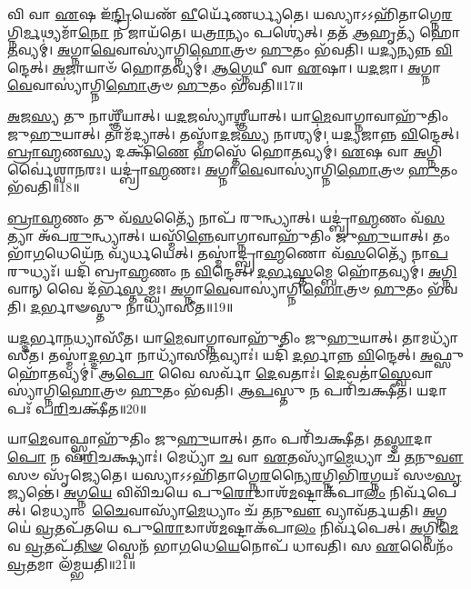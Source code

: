 𑌵𑌿 𑌵𑌾 \ul{𑌏}\-𑌷 𑌇᳴\-\ul{𑌨𑍍𑌦𑍍𑌰𑌿}\-𑌯𑍇𑌣᳴ \ul{𑌵𑍀}\-𑌰𑍍𑌯𑍇᳴𑌣𑌰𑍍𑌧𑍍𑌯𑌤𑍇।
𑌯𑌸𑍍𑌯𑌾𑌽𑌽𑌹𑌿᳴𑌤𑌾𑌗𑍍𑌨𑍇\-\-\ul{𑌰}\-𑌗𑍍𑌨𑌿\-\ul{𑌰𑍍𑌮}\-𑌥𑍍𑌯\-𑌮𑌾᳴\-\ul{𑌨𑍋} 𑌨 𑌜𑌾𑌯᳴𑌤𑍇।
𑌯\-\ul{𑌤𑍍𑌰𑌾}\-𑌨𑍍𑌯𑌂 𑌪𑌶𑍍𑌯𑍇॑𑌤𑍍।
𑌤𑌤᳴ \ul{𑌆}\-𑌹𑍃𑌤𑍍𑌯᳴ 𑌹𑍋\-\ul{𑌤}\-𑌵𑍍𑌯𑌮𑍍॑।
\-\ul{𑌅}\-𑌗𑍍𑌨𑌾\-\ul{𑌵𑍇}\-𑌵𑌾𑌸𑍍𑌯𑌾॑𑌗𑍍𑌨𑌿\-\ul{𑌹𑍋}\-𑌤𑍍𑌰𑍞 \ul{𑌹𑍁}\-𑌤𑌂 𑌭᳴𑌵𑌤𑌿।
𑌯\-\ul{𑌦𑍍𑌯}\-𑌨𑍍𑌯𑌨𑍍𑌨 \ul{𑌵𑌿}\-𑌨𑍍𑌦𑍇𑌤𑍍।
\-\ul{𑌅}\-𑌜𑌾𑌯𑌾𑍞᳴ 𑌹𑍋\-\ul{𑌤}\-𑌵𑍍𑌯𑌮𑍍॑।
\-\ul{𑌆}\-\-\ul{𑌗𑍍𑌨𑍇}\-𑌯𑍀 𑌵𑌾 \ul{𑌏}\-𑌷𑌾।
𑌯\-\ul{𑌦}\-𑌜𑌾।
\-\ul{𑌅}\-𑌗𑍍𑌨𑌾\-\ul{𑌵𑍇}\-𑌵𑌾𑌸𑍍𑌯𑌾॑𑌗𑍍𑌨𑌿\-\ul{𑌹𑍋}\-𑌤𑍍𑌰𑍞 \ul{𑌹𑍁}\-𑌤𑌂 𑌭᳴𑌵𑌤𑌿॥17॥

\-\ul{𑌅}\-𑌜\-\ul{𑌸𑍍𑌯} 𑌤𑍁 𑌨𑌾𑌶𑍍𑌞𑍀᳴𑌯𑌾𑌤𑍍।
𑌯\-\ul{𑌦}\-𑌜𑌸𑍍𑌯𑌾॑\-\ul{𑌶𑍍𑌞𑍀}\-𑌯𑌾𑌤𑍍।
𑌯𑌾\-\ul{𑌮𑍇}\-𑌵𑌾𑌗𑍍𑌨𑌾𑌵𑌾𑌹𑍁᳴𑌤𑌿𑌂 𑌜𑍁\-\ul{𑌹𑍁}\-𑌯𑌾𑌤𑍍।
𑌤𑌾𑌮᳴𑌦𑍍𑌯𑌾𑌤𑍍।
𑌤𑌸𑍍𑌮𑌾᳴\-\ul{𑌦}\-𑌜\-\ul{𑌸𑍍𑌯} 𑌨𑌾𑌶𑍍𑌯𑌮𑍍॑।
𑌯\-\ul{𑌦𑍍𑌯}\-𑌜𑌾𑌨𑍍𑌨 \ul{𑌵𑌿}\-𑌨𑍍𑌦𑍇𑌤𑍍।
\-\ul{𑌬𑍍𑌰𑌾}\-\-\ul{𑌹𑍍𑌮}\-𑌣\-\ul{𑌸𑍍𑌯} 𑌦𑌕𑍍𑌷𑌿᳴\-\ul{𑌣𑍇} 𑌹𑌸𑍍𑌤𑍇᳴ 𑌹𑍋\-\ul{𑌤}\-𑌵𑍍𑌯𑌮𑍍॑।
\-\ul{𑌏}\-𑌷 𑌵𑌾 \ul{𑌅}\-𑌗𑍍𑌨𑌿𑌰𑍍𑌵𑍈॑𑌶𑍍𑌵𑌾\-\ul{𑌨}\-𑌰𑌃।
𑌯𑌦𑍍𑌬𑍍𑌰𑌾॑\-\ul{𑌹𑍍𑌮}\-𑌣𑌃।
\-\ul{𑌅}\-𑌗𑍍𑌨𑌾\-\ul{𑌵𑍇}\-𑌵𑌾𑌸𑍍𑌯𑌾॑𑌗𑍍𑌨𑌿\-\ul{𑌹𑍋}\-𑌤𑍍𑌰𑍞 \ul{𑌹𑍁}\-𑌤𑌂 𑌭᳴𑌵𑌤𑌿॥18॥

\-\ul{𑌬𑍍𑌰𑌾}\-\-\ul{𑌹𑍍𑌮}\-𑌣𑌂 𑌤𑍁 𑌵᳴\-\ul{𑌸}\-𑌤𑍍𑌯𑍈᳴ 𑌨𑌾𑌪᳴ 𑌰𑍁𑌨𑍍𑌧𑍍𑌯𑌾𑌤𑍍।
𑌯𑌦𑍍𑌬𑍍𑌰𑌾॑\-\ul{𑌹𑍍𑌮}\-𑌣𑌂 𑌵᳴\-\ul{𑌸}\-𑌤𑍍𑌯𑌾 𑌅᳴𑌪\-\ul{𑌰𑍁}\-𑌨𑍍𑌧𑍍𑌯𑌾𑌤𑍍।
𑌯𑌸𑍍𑌮𑌿᳴\-\ul{𑌨𑍍𑌨𑍇}\-𑌵𑌾𑌗𑍍𑌨𑌾𑌵𑌾𑌹𑍁᳴𑌤𑌿𑌂 𑌜𑍁\-\ul{𑌹𑍁}\-𑌯𑌾𑌤𑍍।
𑌤𑌂 𑌭𑌾᳴\-\ul{𑌗}\-𑌧𑍇𑌯𑍇᳴\-\ul{𑌨} 𑌵𑍍𑌯᳴𑌰𑍍𑌧𑌯𑍇𑌤𑍍।
𑌤𑌸𑍍𑌮𑌾॑𑌦𑍍𑌬𑍍𑌰𑌾\-\ul{𑌹𑍍𑌮}\-𑌣𑍋 𑌵᳴\-\ul{𑌸}\-𑌤𑍍𑌯𑍈᳴ 𑌨𑌾\-\ul{𑌪}\-𑌰𑍁𑌧𑍍𑌯𑌃᳴।
𑌯𑌦𑌿᳴ 𑌬𑍍𑌰𑌾\-\ul{𑌹𑍍𑌮}\-𑌣𑌂 𑌨 \ul{𑌵𑌿}\-𑌨𑍍𑌦𑍇𑌤𑍍।
\-\ul{𑌦}\-\-\ul{𑌰𑍍𑌭}\-\-\ul{𑌸𑍍𑌤}\-𑌮𑍍𑌬𑍇 𑌹𑍋᳴\-\ul{𑌤}\-𑌵𑍍𑌯𑌮𑍍॑।
\-\ul{𑌅}\-\-\ul{𑌗𑍍𑌨𑌿}\-𑌵𑌾𑌨𑍍 𑌵𑍈 𑌦᳴𑌰𑍍𑌭\-\ul{𑌸𑍍𑌤}\-𑌮𑍍𑌬𑌃।
\-\ul{𑌅}\-𑌗𑍍𑌨𑌾\-\ul{𑌵𑍇}\-𑌵𑌾𑌸𑍍𑌯𑌾॑𑌗𑍍𑌨𑌿\-\ul{𑌹𑍋}\-𑌤𑍍𑌰𑍞 \ul{𑌹𑍁}\-𑌤𑌂 𑌭᳴𑌵𑌤𑌿।
\-\ul{𑌦}\-𑌰𑍍𑌭𑌾𑍟𑌸𑍍𑌤𑍁 𑌨𑌾𑌧𑍍𑌯𑌾᳴𑌸𑍀𑌤॥19॥

𑌯\-\ul{𑌦𑍍𑌦}\-𑌰𑍍𑌭𑌾\-\ul{𑌨}\-𑌧𑍍𑌯𑌾𑌸𑍀᳴𑌤।
𑌯𑌾\-\ul{𑌮𑍇}\-𑌵𑌾𑌗𑍍𑌨𑌾𑌵𑌾𑌹𑍁᳴𑌤𑌿𑌂 𑌜𑍁\-\ul{𑌹𑍁}\-𑌯𑌾𑌤𑍍।
𑌤𑌾𑌮𑌧𑍍𑌯𑌾᳴𑌸𑍀𑌤।
𑌤𑌸𑍍𑌮𑌾॑\-\ul{𑌦𑍍𑌦}\-𑌰𑍍𑌭𑌾 𑌨𑌾𑌧𑍍𑌯𑌾᳴𑌸𑌿\-\ul{𑌤}\-𑌵𑍍𑌯𑌾𑌃॑।
𑌯𑌦𑌿᳴ \ul{𑌦}\-𑌰𑍍𑌭𑌾𑌨𑍍𑌨 \ul{𑌵𑌿}\-𑌨𑍍𑌦𑍇𑌤𑍍।
\-\ul{𑌅}\-𑌫𑍍𑌸𑍁 𑌹𑍋᳴\-\ul{𑌤}\-𑌵𑍍𑌯𑌮𑍍॑।
𑌆\-\ul{𑌪𑍋} 𑌵𑍈 𑌸𑌰𑍍𑌵𑌾᳴ \ul{𑌦𑍇}\-𑌵𑌤𑌾𑌃॑।
\-\ul{𑌦𑍇}\-𑌵𑌤𑌾॑\-\ul{𑌸𑍍𑌵𑍇}\-𑌵𑌾𑌸𑍍𑌯𑌾॑𑌗𑍍𑌨𑌿\-\ul{𑌹𑍋}\-𑌤𑍍𑌰𑍞 \ul{𑌹𑍁}\-𑌤𑌂 𑌭᳴𑌵𑌤𑌿।
𑌆\-\ul{𑌪}\-𑌸𑍍𑌤𑍁 𑌨 𑌪𑌰𑌿᳴𑌚𑌕𑍍𑌷𑍀𑌤।
𑌯𑌦𑌾𑌪𑌃᳴ 𑌪\-\ul{𑌰𑌿}\-𑌚𑌕𑍍𑌷𑍀᳴𑌤॥20॥

𑌯𑌾\-\ul{𑌮𑍇}\-𑌵𑌾𑌫𑍍𑌸𑍍𑌵𑌾𑌹𑍁᳴𑌤𑌿𑌂 𑌜𑍁\-\ul{𑌹𑍁}\-𑌯𑌾𑌤𑍍।
𑌤𑌾𑌂 𑌪𑌰𑌿᳴𑌚𑌕𑍍𑌷𑍀𑌤।
𑌤\-\ul{𑌸𑍍𑌮𑌾}\-𑌦𑌾\-\ul{𑌪𑍋} 𑌨 𑌪᳴\-\ul{𑌰𑌿}\-𑌚𑌕𑍍𑌷𑍍𑌯𑌾𑌃॑।
𑌮𑍇𑌧𑍍𑌯𑌾᳴ \ul{𑌚} 𑌵𑌾 \ul{𑌏}\-𑌤𑌸𑍍𑌯𑌾᳴\-\ul{𑌮𑍇}\-𑌧𑍍𑌯𑌾 𑌚᳴ \ul{𑌤}\-𑌨𑍁\-\ul{𑌵𑍗} 𑌸𑍞 𑌸𑍃᳴𑌜𑍍𑌯𑍇𑌤𑍇।
𑌯𑌸𑍍𑌯𑌾𑌽𑌽𑌹𑌿᳴𑌤𑌾𑌗𑍍𑌨𑍇\-\ul{𑌰}\-𑌨𑍍𑌯𑍈\-\ul{𑌰}\-𑌗𑍍𑌨𑌿𑌭𑌿᳴\-\ul{𑌰}\-𑌗𑍍𑌨𑌯𑌃᳴ 𑌸𑍞\-\ul{𑌸𑍃}\-𑌜𑍍𑌯𑌨𑍍𑌤𑍇॑।
\-\ul{𑌅}\-𑌗𑍍𑌨\-\ul{𑌯𑍇} 𑌵𑌿𑌵𑌿᳴𑌚𑌯𑍇 𑌪𑍁\-\ul{𑌰𑍋}\-𑌡𑌾𑌶᳴\-\ul{𑌮}\-𑌷𑍍𑌟𑌾\-𑌕᳴𑌪𑌾\-\ul{𑌲𑌂} 𑌨𑌿𑌰𑍍𑌵᳴𑌪𑍇𑌤𑍍।
𑌮𑍇𑌧𑍍𑌯𑌾𑌂 \ul{𑌚𑍈}\-𑌵𑌾𑌸𑍍𑌯𑌾᳴\-\ul{𑌮𑍇}\-𑌧𑍍𑌯𑌾𑌂 𑌚᳴ \ul{𑌤}\-𑌨𑍁\-\ul{𑌵𑍗} 𑌵𑍍𑌯𑌾𑌵᳴𑌰𑍍𑌤𑌯𑌤𑌿।
\-\ul{𑌅}\-𑌗𑍍𑌨𑌯𑍇॑ \ul{𑌵𑍍𑌰}\-𑌤𑌪᳴𑌤𑌯𑍇 𑌪𑍁\-\ul{𑌰𑍋}\-𑌡𑌾𑌶᳴\-\ul{𑌮}\-𑌷𑍍𑌟𑌾\-𑌕᳴𑌪𑌾\-\ul{𑌲𑌂} 𑌨𑌿𑌰𑍍𑌵᳴𑌪𑍇𑌤𑍍।
\-\ul{𑌅}\-𑌗𑍍𑌨𑌿\-\ul{𑌮𑍇}\-𑌵 \ul{𑌵𑍍𑌰}\-𑌤𑌪᳴\-\ul{𑌤𑌿}\-\-\ul{𑍟} 𑌸𑍍𑌵𑍇𑌨᳴ 𑌭𑌾\-\ul{𑌗}\-𑌧𑍇\-\ul{𑌯𑍇}\-𑌨𑍋𑌪᳴ 𑌧𑌾𑌵𑌤𑌿।
𑌸 \ul{𑌏}\-𑌵𑍈𑌨𑌂᳴ \ul{𑌵𑍍𑌰}\-𑌤𑌮𑌾 𑌲᳴𑌮𑍍𑌭𑌯𑌤𑌿॥21॥

